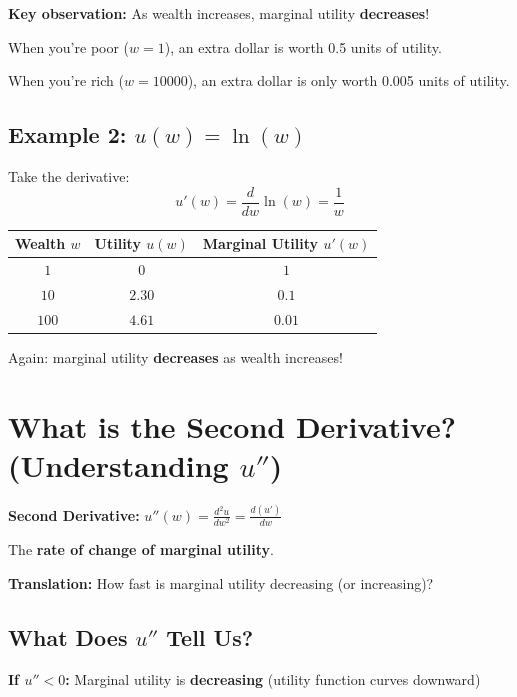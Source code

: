 \documentclass[12pt]{article}
\begin{document}
\textbf{Key observation:} As wealth increases, marginal utility \textbf{decreases}!

When you're poor ($w=1$), an extra dollar is worth 0.5 units of utility.

When you're rich ($w=10000$), an extra dollar is only worth 0.005 units of utility.

\subsection*{Example 2: $u(w) = \ln(w)$}

Take the derivative:
$$u'(w) = \frac{d}{dw}\ln(w) = \frac{1}{w}$$

\begin{center}
\begin{tabular}{|c|c|c|}
\hline
\textbf{Wealth $w$} & \textbf{Utility $u(w)$} & \textbf{Marginal Utility $u'(w)$} \\
\hline
$1$ & $0$ & $1$ \\
\hline
$10$ & $2.30$ & $0.1$ \\
\hline
$100$ & $4.61$ & $0.01$ \\
\hline
\end{tabular}
\end{center}

Again: marginal utility \textbf{decreases} as wealth increases!

\newpage

\section*{What is the Second Derivative? (Understanding $u''$)}

\begin{center}
\colorbox{red!20}{
\begin{minipage}{0.9\textwidth}
\textbf{Second Derivative:} $u''(w) = \frac{d^2u}{dw^2} = \frac{d(u')}{dw}$

The \textbf{rate of change of marginal utility}.

\textbf{Translation:} How fast is marginal utility decreasing (or increasing)?
\end{minipage}
}
\end{center}

\subsection*{What Does $u''$ Tell Us?}

\textbf{If $u'' < 0$:} Marginal utility is \textbf{decreasing} (utility function curves downward)
\end{document}
